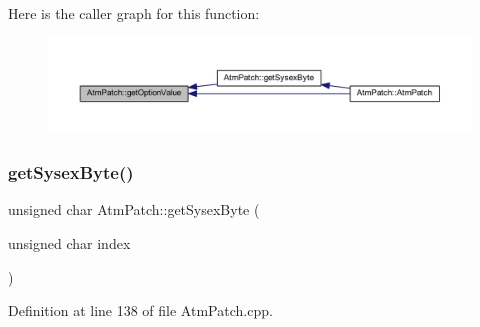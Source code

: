 Here is the caller graph for this function\+:
\nopagebreak
\begin{figure}[H]
\begin{center}
\leavevmode
\includegraphics[width=350pt]{d9/de1/class_atm_patch_ab521c0a108bf7f8bc848755c38330bc0_icgraph}
\end{center}
\end{figure}
\mbox{\label{class_atm_patch_a48b5b2d71e4b83b80979a68372e935ae}} 
\subsubsection{\texorpdfstring{get\+Sysex\+Byte()}{getSysexByte()}}
{\footnotesize\ttfamily unsigned char Atm\+Patch\+::get\+Sysex\+Byte (\begin{DoxyParamCaption}\item[{unsigned char}]{index }\end{DoxyParamCaption})}



Definition at line 138 of file Atm\+Patch.\+cpp.

